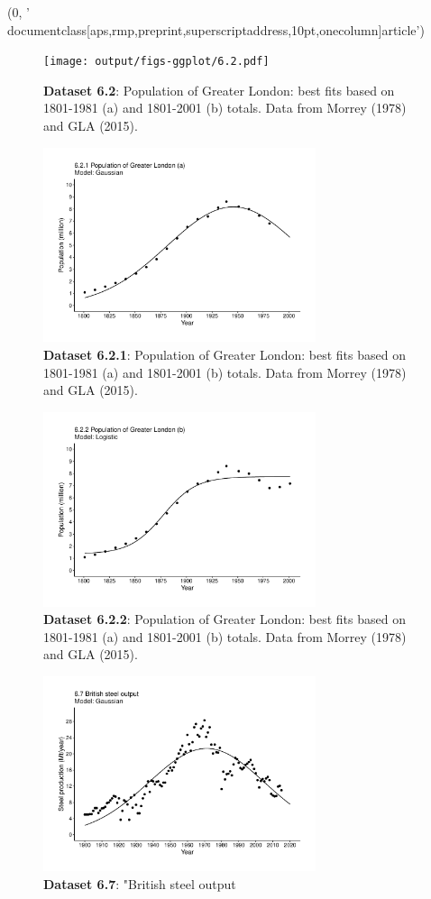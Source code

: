 (0, '\\documentclass[aps,rmp,preprint,superscriptaddress,10pt,onecolumn]{article}\n')
\begin{document}
\begin{figure}[h]
\texttt{[image: output/figs-ggplot/6.2.pdf]}
\caption{\textbf{Dataset 6.2}: Population of Greater London: best fits based on 1801-1981 (a) and 1801-2001 (b) totals. Data from Morrey (1978) and GLA (2015). }
\end{figure}
	
\begin{figure}[h]
\includegraphics[width=8cm]{output/figs-ggplot/6.2.1.pdf}
\caption{\textbf{Dataset 6.2.1}: Population of Greater London: best fits based on 1801-1981 (a) and 1801-2001 (b) totals. Data from Morrey (1978) and GLA (2015). }
\end{figure}
	
\begin{figure}[h]
\includegraphics[width=8cm]{output/figs-ggplot/6.2.2.pdf}
\caption{\textbf{Dataset 6.2.2}: Population of Greater London: best fits based on 1801-1981 (a) and 1801-2001 (b) totals. Data from Morrey (1978) and GLA (2015). }
\end{figure}
	
\begin{figure}[h]
\includegraphics[width=8cm]{output/figs-ggplot/6.7.pdf}
\caption{\textbf{Dataset 6.7}: "British steel output}
\end{figure}
	
\end{document}
